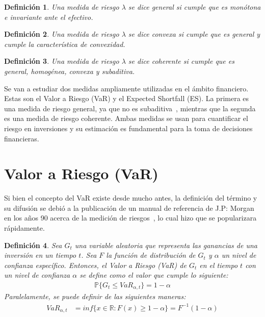 \documentclass[11pt]{book}
\theoremstyle{plain} %
\newtheorem{definition}{Definición}
\theoremstyle{definition} %
\begin{document}
\begin{definition}
   Una medida de riesgo $\lambda$ se dice general si cumple que es monótona 
   e invariante ante el efectivo.
\end{definition}
\begin{definition}
   Una medida de riesgo $\lambda$ se dice convexa si cumple que es general 
   y cumple la característica de convexidad. 
\end{definition}
\begin{definition}
   Una medida de riesgo $\lambda$ se dice coherente si cumple que es general, 
   homogénea, convexa y subaditiva.
\end{definition}

Se van a estudiar dos medidas ampliamente utilizadas en el ámbito financiero. 
Estas son el Valor a Riesgo (VaR) y el Expected Shortfall (ES). La primera es una 
medida de riesgo general, ya que no es subaditiva~\cite{FS08}, 
mientras que la segunda es una medida de riesgo coherente. Ambas
medidas se usan para cuantificar el riesgo en inversiones y su estimación 
es fundamental para la toma de decisiones financieras. \\

\section{Valor a Riesgo (VaR)}

Si bien el concepto del VaR existe desde mucho antes, la definición del término y 
su difusión se debió a la publicación de un manual de referencia 
de J.P: Morgan en los años 90 acerca de la medición de riesgos~\cite{RM96}, 
lo cual hizo que se popularizara rápidamente.\\

\begin{definition}
   Sea $G_t$ una variable aleatoria que representa las ganancias de una 
   inversión en un tiempo $t$. Sea $F$ la función de distribución de
   $G_t$ y $\alpha$ un nivel de confianza específico. Entonces, el
   Valor a Riesgo (VaR) de $G_t$ en el tiempo $t$ con un nivel de confianza
   $\alpha$ se define como el valor que cumple lo siguiente:
   \begin{align*}
         \mathbb{P}\{G_t \leq VaR_{\alpha, t}\} = 1-\alpha
   \end{align*}
   Paralelamente, se puede definir de las siguientes maneras:
   \begin{align*}
      VaR_{\alpha, t} &= inf\{x\in \mathbb{R}:F(x)\geq 1-\alpha\}= F^{-1}(1-\alpha)
   \end{align*}
\end{definition}
\end{document}
